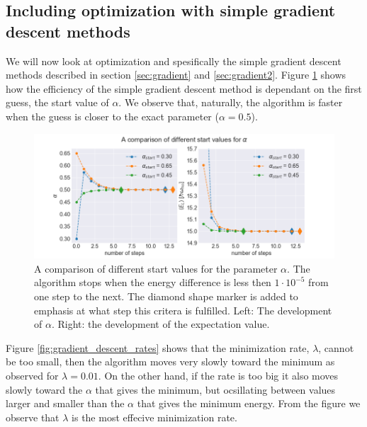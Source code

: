 \subsection{Including optimization with simple  gradient descent methods}

We will now look at optimization and spesifically the simple gradient descent methods described in section \ref{sec:gradient} and \ref{sec:gradient2}. Figure \ref{fig:gradient_descent_starts} shows how the efficiency of the simple gradient descent method is dependant on the first guess, the start value of $\alpha$. We observe that, naturally, the algorithm is faster when the guess is closer to the exact parameter ($\alpha = 0.5$). 

\begin{figure}[H]\caption{A comparison of different start values for the parameter $\alpha$. The algorithm stops when the energy difference is less then $1\cdot10^{-5}$ from one step to the next. The diamond shape marker is added to emphasis at what step this critera is fulfilled. Left: The development of $\alpha$. Right: the development of the expectation value.}\label{fig:gradient_descent_starts}
\center
\includegraphics[width=\linewidth]{../Results/gradient_descent_starts}
\end{figure}

Figure \ref{fig:gradient_descent_rates} shows that the minimization rate, $\lambda$, cannot be too small, then the algorithm moves very slowly toward the minimum as observed for $\lambda = 0.01$. On the other hand, if the rate is too big it also moves slowly toward the $\alpha$ that gives the minimum, but ocsillating between values larger and smaller than the $\alpha$ that gives the minimum energy. From the figure we observe that $\lambda$ is the most effecive minimization rate.

